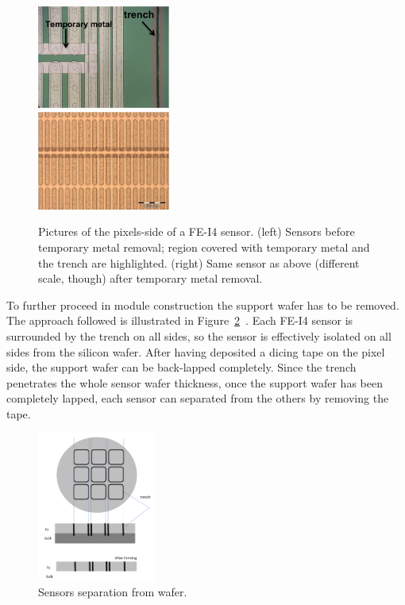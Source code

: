\begin{figure}[!htpb]
\centering
\includegraphics[width=0.39\textwidth]{annotated_temporarymetal.png}\\
\includegraphics[width=0.39\textwidth]{notemporarymetal-izm.png}
\caption{Pictures of the pixels-side of a FE-I4 sensor. (left) Sensors before temporary metal removal; region covered with temporary metal and the trench are highlighted. (right)
Same sensor as above (different scale, though)  after temporary metal removal.}
\label{fig:tempmetal}
\end{figure}

To further proceed in module construction  the support wafer has to be removed. The approach followed is illustrated in Figure~\ref{fig:lapping}~\cite{Bomben:2013vua}. Each FE-I4 sensor is
surrounded by the trench on all sides, so  the sensor is effectively isolated  on all sides from the silicon wafer.
After having deposited a dicing tape on the pixel side, the support wafer can be back-lapped completely. Since the trench penetrates  the whole sensor wafer thickness,
once the support wafer has been completely lapped, each sensor can separated from the others by removing the tape.


\begin{figure}[!htpb]
\centering
\includegraphics[width=0.35\textwidth]{edgelesslapping.pdf}
\caption{Sensors separation from wafer.}
\label{fig:lapping}
\end{figure}


